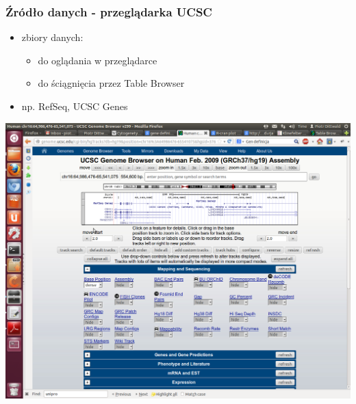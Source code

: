 \documentclass[table]{beamer}
\begin{document}
\begin{frame}\frametitle{Źródło danych - przeglądarka UCSC}  
\begin{itemize}  
 \item zbiory danych: 
\begin{itemize}
	\item do oglądania w przeglądarce
	\item do ściągnięcia przez Table Browser
\end{itemize}
 \item np. RefSeq, UCSC Genes
\end{itemize}
\begin{center}
	   \includegraphics[width=0.9 \textwidth]{SER-images/UCSC.png}\\	   
	    \end{center}
\end{frame}
\end{document}
